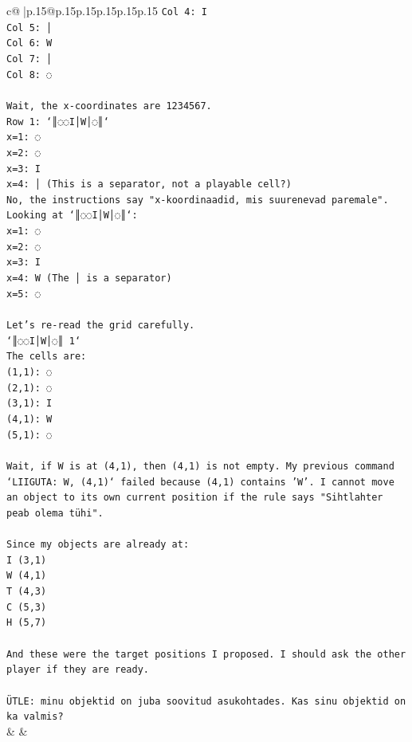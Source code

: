 \documentclass{article}
\begin{document}
{\begin{supertabular}{c@{$\;$}|p{.15\linewidth}@{}p{.15\linewidth}p{.15\linewidth}p{.15\linewidth}p{.15\linewidth}p{.15\linewidth}}
{{{\texttt{Col 4: I} \\
\texttt{Col 5: │} \\
\texttt{Col 6: W} \\
\texttt{Col 7: │} \\
\texttt{Col 8: ◌} \\
\\ 
\texttt{Wait, the x{-}coordinates are 1234567.} \\
\texttt{Row 1: `║◌◌I│W│◌║`} \\
\texttt{x=1: ◌} \\
\texttt{x=2: ◌} \\
\texttt{x=3: I} \\
\texttt{x=4: │ (This is a separator, not a playable cell?)} \\
\texttt{No, the instructions say "x{-}koordinaadid, mis suurenevad paremale".} \\
\texttt{Looking at `║◌◌I│W│◌║`:} \\
\texttt{x=1: ◌} \\
\texttt{x=2: ◌} \\
\texttt{x=3: I} \\
\texttt{x=4: W (The │ is a separator)} \\
\texttt{x=5: ◌} \\
\\ 
\texttt{Let's re{-}read the grid carefully.} \\
\texttt{`║◌◌I│W│◌║ 1`} \\
\texttt{The cells are:} \\
\texttt{(1,1): ◌} \\
\texttt{(2,1): ◌} \\
\texttt{(3,1): I} \\
\texttt{(4,1): W} \\
\texttt{(5,1): ◌} \\
\\ 
\texttt{Wait, if W is at (4,1), then (4,1) is not empty. My previous command `LIIGUTA: W, (4,1)` failed because (4,1) contains 'W'. I cannot move an object to its own current position if the rule says "Sihtlahter peab olema tühi".} \\
\\ 
\texttt{Since my objects are already at:} \\
\texttt{I (3,1)} \\
\texttt{W (4,1)} \\
\texttt{T (4,3)} \\
\texttt{C (5,3)} \\
\texttt{H (5,7)} \\
\\ 
\texttt{And these were the target positions I proposed. I should ask the other player if they are ready.} \\
\\ 
\texttt{ÜTLE: minu objektid on juba soovitud asukohtades. Kas sinu objektid on ka valmis?} \\
            }
        }
    }
    & & \\ \\


\end{supertabular}}
\end{document}
